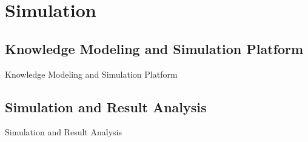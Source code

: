 \section{Simulation}
\subsection{Knowledge Modeling and Simulation Platform}
\begin{frame}{Knowledge Modeling and Simulation Platform}
\end{frame}

\subsection{Simulation and Result Analysis}
\begin{frame}{Simulation and Result Analysis}
\end{frame}